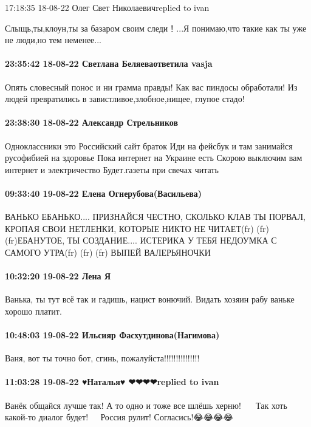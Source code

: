  
 
 
 
 

17:18:35 18-08-22
Олег Свет Николаевичreplied to ivan

Слыщь,ты,клоун,ты за базаром своим следи！...Я понимаю,что такие как ты уже не люди,но тем неменее...

\paragraph{23:35:42 18-08-22 Светлана Беляеваответила vasja}

Опять словесный понос и ни грамма правды! Как вас пиндосы обработали! Из людей
превратились в завистливое,злобное,нищее, глупое стадо!

\paragraph{23:38:30 18-08-22 Александр Стрельников}

Одноклассники это Российский сайт браток Иди на фейсбук и там занимайся
русофибией на здоровье Пока интернет на Украине есть Скорою выключим вам
интернет и электричество Будет.газеты при свечах читать

\paragraph{09:33:40 19-08-22 Елена Огнерубова(Васильева)}

ВАНЬКО ЕБАНЬКО.... ПРИЗНАЙСЯ ЧЕСТНО, СКОЛЬКО КЛАВ ТЫ ПОРВАЛ, КРОПАЯ СВОИ
НЕТЛЕНКИ, КОТОРЫЕ НИКТО НЕ ЧИТАЕТ(fr) (fr) (fr)ЕБАНУТОЕ, ТЫ СОЗДАНИЕ....
ИСТЕРИКА У ТЕБЯ НЕДОУМКА С САМОГО УТРА(fr) (fr) (fr) ВЫПЕЙ ВАЛЕРЬЯНОЧКИ

\paragraph{10:32:20 19-08-22 Лена Я}

Ванька, ты тут всё так и гадишь, нацист вонючий. Видать хозяин рабу ваньке
хорошо платит.

\paragraph{10:48:03 19-08-22 Ильсияр Фасхутдинова(Нагимова)}

Ваня, вот ты точно бот, сгинь, пожалуйста!!!!!!!!!!!!!!!

\paragraph{11:03:28 19-08-22 ♥Наталья♥ ❤❤❤❤replied to ivan}

Ванёк общайся лучше так! А то одно и тоже все шлёшь херню! 🤣🤣🤣🤣🤣Так хоть
какой-то диалог будет!🤣🤣🤣🤣
Россия рулит! Согласись!😂😂😂😂

